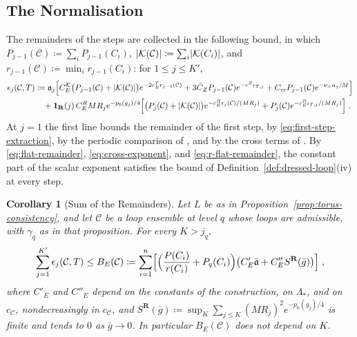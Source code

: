 \documentclass[11pt]{preprint}
\DeclarePairedDelimiter{\abs}{\lvert}{\rvert}
\numberwithin{equation}{section}
\newtheorem{corollary}[theorem]{Corollary}
\theoremstyle{definition}
\theoremstyle{remark}
\theoremstyle{plain}
\begin{document}
\subsection{The Normalisation}\label{sec:normalisation}

The remainders of the steps are collected in the following bound, in which $P_{j-1}(\mathcal C) \coloneqq \sum_iP_{j-1}(C_i)$, $\abs{\mathcal K(\mathcal C)} \coloneqq \sum_i\abs{\mathcal K(C_i)}$, and $r_{j-1}(\mathcal C) \coloneqq \min_ir_{j-1}(C_i)$: for $1 \leq j \leq K'$,
\begin{equation}\label{eq:step-remainder}
\begin{split}
    \epsilon_j(\mathcal C, T) &\coloneqq \mathfrak a_j\Bigl[C^{\mathcal K}_E\bigl(P_{j-1}(\mathcal C) + \abs{\mathcal K(\mathcal C)}\bigr)e^{-2c^T_Er_{j-1}(\mathcal C)} + 3\bar C_ZP_{j-1}(\mathcal C)e^{-c^Z\iota_{T,j}} + C_{\mathrm{cr}}P_{j-1}(\mathcal C)e^{-\nu_\times a_j/M}\Bigr]\\
    &\quad + \mathbf 1_{\mathbf R}(j)\,C^R_EMR_je^{-p_0(g_j)/4}\Bigl[\bigl(P_j(\mathcal C) + \abs{\mathcal K(\mathcal C)}\bigr)e^{-c^R_Er_j(\mathcal C)/(MR_j)} + P_j(\mathcal C)e^{-c^R_E\iota_{T,j}/(MR_j)}\Bigr]\;.
\end{split}
\end{equation}
At $j = 1$ the first line bounds the remainder of the first step, by \eqref{eq:first-step-extraction}, by the periodic comparison of \cite[Appendix~F]{WilsonFirstStep}, and by the cross terms of \cite[Section~10]{WilsonFirstStep}. By \eqref{eq:flat-remainder}, \eqref{eq:cross-exponent}, and \eqref{eq:r-flat-remainder}, the constant part of the scalar exponent satisfies the bound of Definition~\ref{def:dressed-loop}(iv) at every step.

\begin{corollary}[Sum of the Remainders]\label{cor:remainder-sum}
Let $L$ be as in Proposition~\ref{prop:torus-consistency}, and let $\mathcal C$ be a loop ensemble at level $q$ whose loops are admissible, with $\gamma_q$ as in that proposition. For every $K > j_q$,
\begin{equation}\label{eq:remainder-sum}
    \sum_{j=1}^{K'}\epsilon_j(\mathcal C, T) \leq B_E(\mathcal C) \coloneqq \sum_{i=1}^{n}\Bigl[\Bigl(\frac{P(C_i)}{r(C_i)} + P_q(C_i)\Bigr)\bigl(C'_E\bar{\mathfrak a} + C''_ES^{\mathbf R}(\bar g)\bigr)\Bigr]\;,
\end{equation}
where $C'_E$ and $C''_E$ depend on the constants of the construction, on $\Lambda_*$, and on $c_{\mathcal C}$, nondecreasingly in $c_{\mathcal C}$, and $S^{\mathbf R}(\bar g) \coloneqq \sup_K\sum_{j \leq K}(MR_j)^2e^{-p_0(g_j)/4}$ is finite and tends to $0$ as $\bar g \to 0$. In particular $B_E(\mathcal C)$ does not depend on $K$.
\end{corollary}
\end{document}
